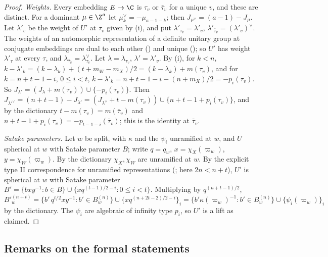 \begin{proof}
\emph{Weights.} Every embedding $E\to\C$ is $\tau_v$ or $\bar\tau_v$ for a unique $v$, and these are distinct. For a
dominant $\mu\in\Z^a$ let $\mu^\vee_k=-\mu_{a-1-k}$; then $J_{\mu^\vee}=(a-1)-J_\mu$. Let $\lambda'_v$ be the weight of $U'$
at $\tau_v$ given by (i), and put $\lambda'_{\tau_v}=\lambda'_v$, $\lambda'_{\bar\tau_v}=(\lambda'_v)^\vee$. The weights of an
automorphic representation of a definite unitary group at conjugate embeddings are dual to each other
() and unique ();
so $U'$ has weight $\lambda'_\tau$ at every $\tau$, and $\lambda_{\bar\tau_v}=\lambda_{\tau_v}^\vee$. Let $\lambda=\lambda_{\tau_v}$,
$\lambda'=\lambda'_v$. By (i), for $k<n$, $k-\lambda'_k=(k-\lambda_k)+(t+m_W-m_X)/2=(k-\lambda_k)+m(\tau_v)$, and for
$k=n+t-1-i$, $0\le i<t$, $k-\lambda'_k=n+t-1-i-(n+m_X)/2=-p_i(\tau_v)$. So
$J_{\lambda'}=(J_\lambda+m(\tau_v))\cup\{-p_i(\tau_v)\}$. Then
$J_{\lambda'^\vee}=(n+t-1)-J_{\lambda'}=(J_{\lambda^\vee}+t-m(\tau_v))\cup\{n+t-1+p_i(\tau_v)\}$, and by the dictionary
$t-m(\tau_v)=m(\bar\tau_v)$ and $n+t-1+p_i(\tau_v)=-p_{t-1-i}(\bar\tau_v)$; this is the identity at $\bar\tau_v$.

\emph{Satake parameters.} Let $w$ be split, with $\kappa$ and the $\psi_i$ unramified at $w$, and $U$ spherical at $w$ with
Satake parameter $B$; write $q=q_w$, $x=\chi_X(\varpi_w)$, $y=\chi_W(\varpi_w)$. By the dictionary $\chi_X,\chi_W$ are
unramified at $w$. By the explicit type II correspondence for unramified representations
(; here $2n<n+t$), $U'$ is spherical at $w$ with Satake parameter
$B'=\{bxy^{-1}:b\in B\}\cup\{xq^{(t-1)/2-i}:0\le i<t\}$. Multiplying by $q^{(n+t-1)/2}$,
\[
  B'^{(n+t)}_w=\{b'\,q^{t/2}xy^{-1}:b'\in B^{(n)}_w\}\cup\{xq^{(n+2t-2)/2-i}\}_i
  =\{b'\kappa(\varpi_w)^{-1}:b'\in B^{(n)}_w\}\cup\{\psi_i(\varpi_w)\}_i
\]
by the dictionary. The $\psi_i$ are algebraic of infinity type $p_i$, so $U'$ is a lift as claimed.
\end{proof}

\subsection{Remarks on the formal statements}\label{sec:pf:galred:remarks}

